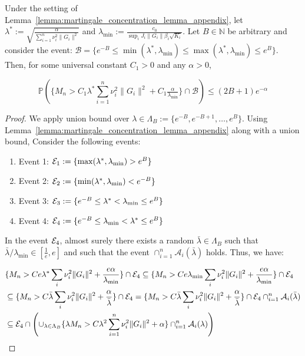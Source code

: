 \begin{lemma}\label{lemma:union_bound_lambda} 
     Under the setting of Lemma~\ref{lemma:martingale_concentration_lemma_appendix}, let $\lambda^* := \sqrt{\frac{\alpha}{\sum_{i=1}^{n}\nu_i^2\|G_i\|^2}}$ and $\lambda_{\min} := \frac{c_0}{\sup_iJ_i\|G_i\|\beta_i\sqrt{K_i}}$. Let $B \in \mathbb{N}$ be arbitrary and consider the event: $\mathcal{B} = \{e^{-B} \leq \min(\lambda^*,\lambda_{\min}) \leq \max(\lambda^{*},\lambda_{\min}) \leq e^{B}\}$. Then, for some universal constant $C_1 > 0$ and any $\alpha > 0$,

 $$\mathbb{P}\left(\{M_n > C_1\lambda^*\sum_{i=1}^{n}\nu_i^2 \|G_i\|^2 + C_1\tfrac{\alpha}{\lambda_{\min}}\}\cap\mathcal{B} \right) \leq  (2B+1)e^{-\alpha}$$ 
    
\end{lemma}
\begin{proof}
We apply union bound over $\lambda \in \Lambda_B := \{e^{-B},e^{-B+1},\dots,e^{B}\}$. Using Lemma~\ref{lemma:martingale_concentration_lemma_appendix} along with a union bound,
Consider the following events:
\begin{enumerate}
    \item Event 1: $\mathcal{E}_1 := \{\max(\lambda^*,\lambda_{\min}) > e^B\}$
    \item Event 2: $\mathcal{E}_2 := \{\min(\lambda^*,\lambda_{\min}) < e^{-B}\}$
    \item Event 3: $\mathcal{E}_3 := \{e^{-B} \leq \lambda^* < \lambda_{\min} \leq e^B\}$
    \item Event 4: $\mathcal{E}_4 := \{e^{-B} \leq \lambda_{\min} < \lambda^* \leq e^B\}$
\end{enumerate}

In the event $\mathcal{E}_4$, almost surely there exists a random $\bar{\lambda} \in \Lambda_B$ such that $\bar{\lambda}/\lambda_{\min} \in [\frac{1}{e},e]$ and such that the event $\cap_{i=1}^{n}\mathcal{A}_i(\bar{\lambda})$ holds. Thus, we have:

\begin{align}
&\{M_n > Ce\lambda^* \sum_i \nu_i^2\|G_i\|^2 + \frac{e\alpha}{\lambda_{\min}}\}\cap \mathcal{E}_4 \subseteq  \{M_n > Ce \lambda_{\min}\sum_i \nu_i^2 \|G_i\|^2 + \frac{e\alpha}{\lambda_{\min}}\}\cap \mathcal{E}_4 \nonumber \\
&\subseteq \{M_n > C\bar{\lambda}\sum_i \nu_i^2 \|G_i\|^2 + \frac{\alpha}{\bar{\lambda}}\}\cap \mathcal{E}_4 = \{M_n > C \bar{\lambda}\sum_i \nu_i^2 \|G_i\|^2 + \frac{\alpha}{\bar{\lambda}}\}\cap \mathcal{E}_4 \cap_{i=1}^n \mathcal{A}_i(\bar{\lambda}) \nonumber \\
&\subseteq \mathcal{E}_4\cap\left(\cup_{\lambda \in \Lambda_B}\{\lambda M_n > C \lambda^2\sum_{i=1}^{n}\nu_i^2\|G_i\|^2 + \alpha\}\cap_{i=1}^{n} \mathcal{A}_i(\lambda)\right)
\end{align}


\end{proof}

